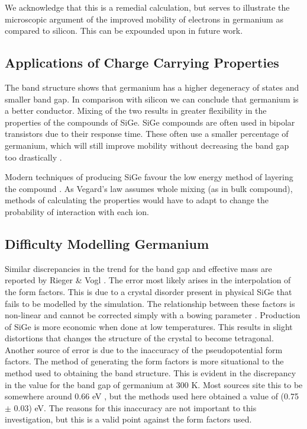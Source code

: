 \documentclass[10pt, twocolumn]{revtex4}    %
\begin{document}
We acknowledge that this is a remedial calculation, but serves to illustrate the microscopic argument of the improved mobility of electrons in germanium as compared to silicon. This can be expounded upon in future work.


\subsection{Applications of Charge Carrying Properties}

The band structure shows that germanium has a higher degeneracy of states and  smaller band gap. In comparison with silicon we can conclude that germanium is a better conductor. Mixing of the two results in greater flexibility in the properties of the compounds of SiGe. SiGe compounds are often used in bipolar transistors due to their response time. These often use a smaller percentage of germanium, which will still improve mobility without decreasing the band gap too drastically \cite{ref19}.

Modern techniques of producing SiGe favour the low energy method of layering the compound \cite{ref20} \cite{ref21}. As Vegard's law assumes whole mixing (as in bulk compound), methods of calculating the properties would have to adapt to change the probability of interaction with each ion.

\subsection{Difficulty Modelling Germanium}

Similar discrepancies in the trend for the band gap and effective mass are reported by Rieger \& Vogl \cite{ref07}. The error most likely arises in the interpolation of the form factors. This is due to a crystal disorder present in physical SiGe that fails to be modelled by the simulation. The relationship between these factors is non-linear and cannot be corrected simply with a bowing parameter \cite{ref07}. Production of SiGe is more economic when done at low temperatures. This results in  slight distortions that changes the structure of the crystal to become tetragonal. \\

Another source of error is  due to the inaccuracy of the pseudopotential form factors. The method of generating the form factors is more situational to the method used to obtaining the band structure. This is evident in the discrepancy in the value for the band gap of germanium at 300 K. Most sources site this to be somewhere around 0.66 eV \cite{ref01}, but the methods used here obtained a value of (0.75 $\pm$ 0.03) eV. The reasons for this inaccuracy are not important to this investigation, but this is a valid point against the form factors used. \\
\end{document}
